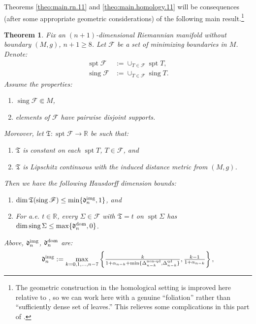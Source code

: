 \documentclass[11pt, letterpaper, reqno]{amsart}
\numberwithin{equation}{section}
\newtheorem{Thm}[Def]{Theorem}
\theoremstyle{remark}
\newcommand{\RR}{\mathbb{R}}
\newcommand{\frT}{\mathfrak{T}}
\newcommand{\supp}{\operatorname{spt}}
\newcommand{\sing}{\operatorname{sing}}
\begin{document}
Theorems \ref{theo:main.rn.11} and \ref{theo:main.homology.11} will be consequences (after some appropriate geometric considerations) of the following main result.\footnote{The geometric construction in the homological setting is improved here relative to \cite{CMS:generic.9.10}, so we can work here with a genuine ``foliation'' rather than ``sufficiently dense set of leaves.'' This relieves some complications in this part of \cite{CMS:generic.9.10}.} 

\begin{Thm} \label{theo:small.sing.dim}
	Fix an $(n+1)$-dimensional Riemannian manifold without boundary $(M, g)$, $n+1 \geq 8$. Let $\mathscr{F}$ be a set of minimizing boundaries in $M$. Denote:
	\begin{align*}
		\supp \mathscr{F} & := \cup_{T \in \mathscr{F}} \supp T, \\
		\sing \mathscr{F} & := \cup_{T \in \mathscr{F}} \sing T.
	\end{align*}
    Assume the properties:
	\begin{enumerate}
		\item[(1)] $\sing \mathscr{F} \Subset M$,
		\item[(2)] elements of $\mathscr{F}$ have pairwise disjoint supports.
	\end{enumerate}
    Moreover, let $\frT : \supp \mathscr{F} \to \RR$ be such that:
	\begin{enumerate}
		\item[(3)] $\frT$ is constant on each $\supp T$, $T \in \mathscr{F}$, and
		\item[(4)] $\frT$ is Lipschitz continuous with the induced distance metric from $(M, g)$.
	\end{enumerate}
	Then we have the following Hausdorff dimension bounds:
	\begin{enumerate}
		\item[(i)] $\dim \frT(\sing \mathscr{F}) \leq \min \{ \mathfrak{d}_{n}^{\textnormal{img}}, 1 \}$, and
		\item[(ii)] For a.e. $t \in \RR$, every $\Sigma \in \mathscr{F}$ with $\frT = t$ on $\supp \Sigma$ has $\dim \sing \Sigma \leq \max \{ \mathfrak{d}_{n}^{\textnormal{dom}}, 0 \}$.
	\end{enumerate}
	Above, $\mathfrak{d}_{n}^{\textnormal{img}}$, $\mathfrak{d}_{n}^{\textnormal{dom}}$ are:
	\begin{equation} \label{eq:delta.n}
		\mathfrak{d}_{n}^{\textnormal{img}} := \max_{k = 0, 1, \ldots, n-7} \left\{ \tfrac{k}{1+ \alpha_{n-k} + \min \{ \Delta^{\textnormal{non-qd}}_{n-k}, \Delta^{\textnormal{qd}}_{n-k} \} }, \tfrac{k-1}{1 + \alpha_{n-k}} \right\},

\end{equation}
\end{Thm}
\end{document}
